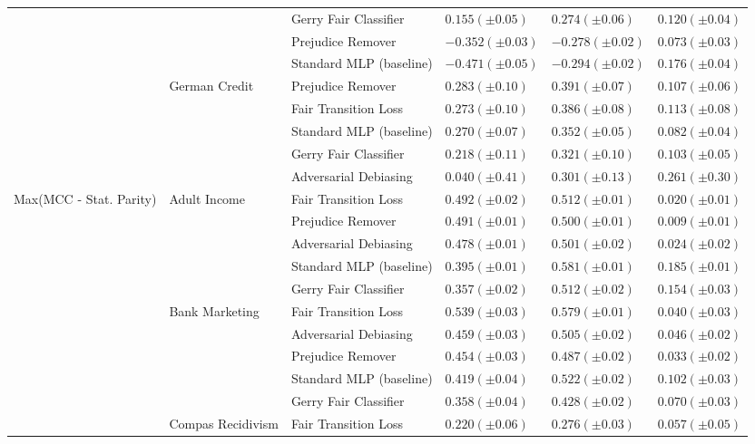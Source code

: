\begin{tabular}{llllll}
 &  & Gerry Fair Classifier & $0.155 (\pm0.05)$ & $0.274 (\pm0.06)$ & $0.120 (\pm0.04)$ \\
 &  & Prejudice Remover & $-0.352 (\pm0.03)$ & $-0.278 (\pm0.02)$ & $0.073 (\pm0.03)$ \\
 &  & Standard MLP (baseline) & $-0.471 (\pm0.05)$ & $-0.294 (\pm0.02)$ & $0.176 (\pm0.04)$ \\
\cline{2-6}
 & \multirow[t]{5}{*}{German Credit} & Prejudice Remover & $0.283 (\pm0.10)$ & $0.391 (\pm0.07)$ & $0.107 (\pm0.06)$ \\
 &  & Fair Transition Loss & $0.273 (\pm0.10)$ & $0.386 (\pm0.08)$ & $0.113 (\pm0.08)$ \\
 &  & Standard MLP (baseline) & $0.270 (\pm0.07)$ & $0.352 (\pm0.05)$ & $0.082 (\pm0.04)$ \\
 &  & Gerry Fair Classifier & $0.218 (\pm0.11)$ & $0.321 (\pm0.10)$ & $0.103 (\pm0.05)$ \\
 &  & Adversarial Debiasing & $0.040 (\pm0.41)$ & $0.301 (\pm0.13)$ & $0.261 (\pm0.30)$ \\
\cline{1-6} \cline{2-6}
\multirow[t]{20}{*}{Max(MCC - Stat. Parity)} & \multirow[t]{5}{*}{Adult Income} & Fair Transition Loss & $0.492 (\pm0.02)$ & $0.512 (\pm0.01)$ & $0.020 (\pm0.01)$ \\
 &  & Prejudice Remover & $0.491 (\pm0.01)$ & $0.500 (\pm0.01)$ & $0.009 (\pm0.01)$ \\
 &  & Adversarial Debiasing & $0.478 (\pm0.01)$ & $0.501 (\pm0.02)$ & $0.024 (\pm0.02)$ \\
 &  & Standard MLP (baseline) & $0.395 (\pm0.01)$ & $0.581 (\pm0.01)$ & $0.185 (\pm0.01)$ \\
 &  & Gerry Fair Classifier & $0.357 (\pm0.02)$ & $0.512 (\pm0.02)$ & $0.154 (\pm0.03)$ \\
\cline{2-6}
 & \multirow[t]{5}{*}{Bank Marketing} & Fair Transition Loss & $0.539 (\pm0.03)$ & $0.579 (\pm0.01)$ & $0.040 (\pm0.03)$ \\
 &  & Adversarial Debiasing & $0.459 (\pm0.03)$ & $0.505 (\pm0.02)$ & $0.046 (\pm0.02)$ \\
 &  & Prejudice Remover & $0.454 (\pm0.03)$ & $0.487 (\pm0.02)$ & $0.033 (\pm0.02)$ \\
 &  & Standard MLP (baseline) & $0.419 (\pm0.04)$ & $0.522 (\pm0.02)$ & $0.102 (\pm0.03)$ \\
 &  & Gerry Fair Classifier & $0.358 (\pm0.04)$ & $0.428 (\pm0.02)$ & $0.070 (\pm0.03)$ \\
\cline{2-6}
 & \multirow[t]{5}{*}{Compas Recidivism} & Fair Transition Loss & $0.220 (\pm0.06)$ & $0.276 (\pm0.03)$ & $0.057 (\pm0.05)$ \\

\end{tabular}
